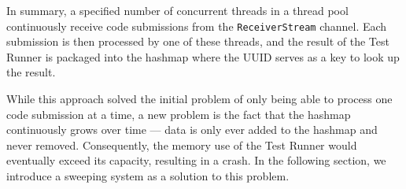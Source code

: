 In summary, a specified number of concurrent threads in a thread pool continuously receive code submissions from the \texttt{ReceiverStream} channel.
Each submission is then processed by one of these threads, and the result of the Test Runner is packaged into the hashmap where the UUID serves as a key to look up the result.

While this approach solved the initial problem of only being able to process one code submission at a time, a new problem is the fact that the hashmap continuously grows over time --- data is only ever added to the hashmap and never removed.
Consequently, the memory use of the Test Runner would eventually exceed its capacity, resulting in a crash.
In the following section, we introduce a sweeping system as a solution to this problem.